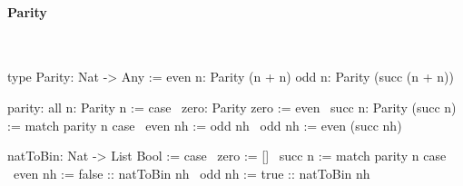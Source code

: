 \paragraph{Parity}
\ \begin{alba}
    type Parity: Nat -> Any :=
        even n: Parity (n + n)
        odd  n: Parity (succ (n + n))

    parity: all n: Parity n := case
        \ zero: Parity zero :=
            even
        \ succ n: Parity (succ n) :=
            match parity n case
                \ even nh :=
                    odd nh
                \ odd nh :=
                    even (succ nh)

    natToBin: Nat -> List Bool := case
        \ zero :=
            []
        \ succ n :=
            match parity n case
                \ even nh :=
                    false :: natToBin nh
                \ odd nh :=
                    true :: natToBin nh
\end{alba}
